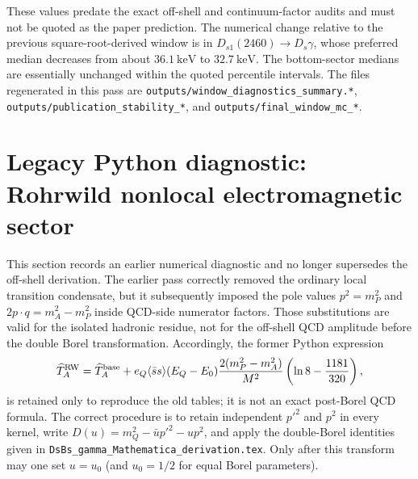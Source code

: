 \documentclass[11pt]{article}
\begin{document}
These values predate the exact off-shell and continuum-factor audits and must
not be quoted as the paper prediction.  The numerical change relative to the
previous square-root-derived window
is in \(D_{s1}(2460)\to D_s\gamma\), whose preferred median decreases from
about \(36.1~\mathrm{keV}\) to \(32.7~\mathrm{keV}\).  The bottom-sector medians are essentially
unchanged within the quoted percentile intervals.  The files regenerated in
this pass are \texttt{outputs/window\_diagnostics\_summary.*},
\texttt{outputs/publication\_stability\_*}, and
\texttt{outputs/final\_window\_mc\_*}.

\section{Legacy Python diagnostic: Rohrwild nonlocal electromagnetic sector}
\label{sec:rohrwild-nonlocal-final-update}

This section records an earlier numerical diagnostic and no longer supersedes
the off-shell derivation.  The earlier pass correctly removed the ordinary
local transition condensate, but it subsequently imposed the pole values
$p^2=m_P^2$ and $2p\cdot q=m_A^2-m_P^2$ inside QCD-side numerator factors.
Those substitutions are valid for the isolated hadronic residue, not for the
off-shell QCD amplitude before the double Borel transformation.  Accordingly,
the former Python expression
\begin{equation}
 \widehat T_A^{\rm RW}=\widehat T_A^{\rm base}
 +e_Q\langle\bar ss\rangle(E_Q-E_0)
 \frac{2(m_P^2-m_A^2)}{M^2}
 \left(\ln8-\frac{1181}{320}\right),
 \label{eq:working-note-rohrwild-em}
\end{equation}
is retained only to reproduce the old tables; it is not an exact post-Borel
QCD formula.  The correct procedure is to retain independent $p'^2$ and $p^2$
in every kernel, write
$D(u)=m_Q^2-\bar u p'^2-up^2$, and apply the double-Borel identities given in
\texttt{DsBs\_gamma\_Mathematica\_derivation.tex}.  Only after this transform
may one set $u=u_0$ (and $u_0=1/2$ for equal Borel parameters).
\end{document}
